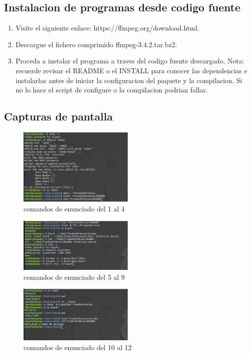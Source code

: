 \documentclass[11pt]{article}
\begin{document}
\subsection{Instalacion de programas desde codigo fuente}
\begin{enumerate}
\item Visite el siguiente enlace: https://ffmpeg.org/download.html.
\item Descargue el fichero comprimido ffmpeg-3.4.2.tar.bz2.
\item Proceda a instalar el programa a traves del codigo fuente descargado.
Nota: recuerde revisar el README o el INSTALL para conocer las dependencias e instalarlas antes de iniciar la configuracion del paquete y la compilacion. Si no lo hace el script de configure o la compilacion podrian fallar.
\end{enumerate}






\subsection{Capturas de pantalla}


\begin{figure}[H]
\centering
\includegraphics[width=0.5\textwidth]{img/1.png}
\caption{comandos de enunciado del 1 al 4}
\end{figure}

\begin{figure}[H]
\centering
\includegraphics[width=0.5\textwidth]{img/2.png}
\caption{comandos de enunciado del 5 al 9}
\end{figure}

\begin{figure}[H]
\centering
\includegraphics[width=0.5\textwidth]{img/3.png}
\caption{comandos de enunciado del 10 al 12}
\end{figure}
\end{document}

